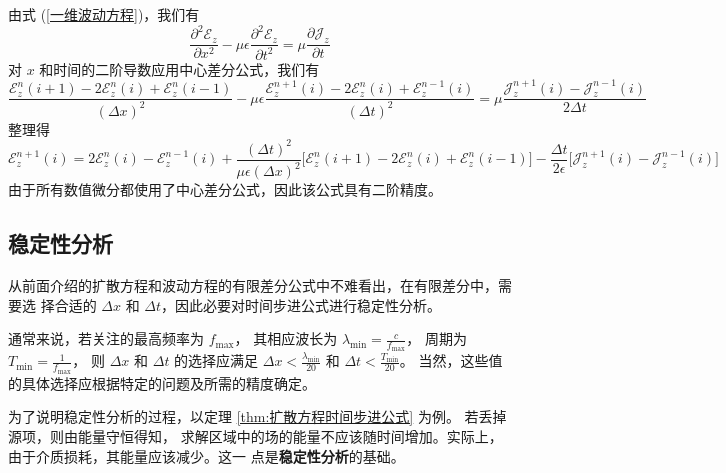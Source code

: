 \begin{solution}
    由式 (\ref{一维波动方程})，我们有
    \begin{equation*}
        \frac{\partial^2 \mathscr{E}_z}{\partial x^2}
        -\mu \epsilon \frac{\partial^2 \mathscr{E}_z}{\partial t^2}
        =\mu \frac{\partial \mathscr{J}_z}{\partial t}
    \end{equation*}
    对 $x$ 和时间的二阶导数应用中心差分公式，我们有
    \begin{equation*}
        \frac{\mathscr{E}_z^{n}(i+1)-2\mathscr{E}_z^n(i)+\mathscr{E}_z^{n}(i-1)}{(\Delta x)^2}
        -\mu \epsilon \frac{\mathscr{E}_z^{n+1}(i)-2\mathscr{E}_z^n(i)+\mathscr{E}_z^{n-1}(i)}{(\Delta t)^2}
        =\mu \frac{\mathscr{J}_z^{n+1}(i)-\mathscr{J}_z^{n-1}(i)}{2\Delta t}
    \end{equation*}
    整理得
    \begin{equation*}
        \mathscr{E}_z^{n+1}(i)=2\mathscr{E}_z^n(i)-\mathscr{E}_z^{n-1}(i)
        +\frac{(\Delta t)^2}{\mu \epsilon (\Delta x)^2}
        \Big[\mathscr{E}_z^n(i+1)-2\mathscr{E}_z^n(i)+\mathscr{E}_z^n(i-1)\Big]
        -\frac{\Delta t}{2\epsilon}\Big[\mathscr{J}_z^{n+1}(i)-\mathscr{J}_z^{n-1}(i)\Big]
    \end{equation*}
    由于所有数值微分都使用了中心差分公式，因此该公式具有二阶精度。
\end{solution}

\subsection{稳定性分析}

\par 从前面介绍的扩散方程和波动方程的有限差分公式中不难看出，在有限差分中，需要选
择合适的 $\Delta x$ 和 $\Delta t$，因此必要对时间步进公式进行稳定性分析。

\begin{note}
    通常来说，若关注的最高频率为 $f_{\text{max}}$，
    其相应波长为 $\lambda_{\text{min}}=\frac{c}{f_{\text{max}}}$，
    周期为 $T_{\text{min}}=\frac{1}{f_{\text{max}}}$，
    则 $\Delta x$ 和 $\Delta t$ 的选择应满足
    $\Delta x < \frac{\lambda_{\text{min}}}{20}$ 和
    $\Delta t < \frac{T_{\text{min}}}{20}$。
    当然，这些值的具体选择应根据特定的问题及所需的精度确定。
\end{note}

\par 为了说明稳定性分析的过程，以定理 \ref{thm:扩散方程时间步进公式} 为例。
若丢掉源项，则由能量守恒得知，
求解区域中的场的能量不应该随时间增加。实际上，由于介质损耗，其能量应该减少。这一
点是\textbf{稳定性分析}的基础。

